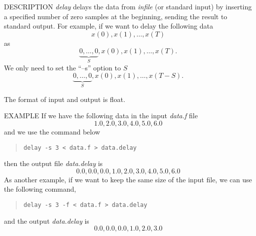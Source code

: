 \begin{synopsis}
\item [delay] [ --s $S$ ] [ --f ] [ {\em infile} ] 
\end{synopsis}

\begin{qsection}{DESCRIPTION}
{\em delay} delays the data from {\em infile} (or standard input) 
by inserting a specified number of zero samples at the beginning, 
sending the result to standard output.
 For example, if we want to delay the following data
\begin{displaymath}
   x(0), x(1), \ldots , x(T)
\end{displaymath}
as
\begin{displaymath}
   \underbrace{0, \dots , 0}_{S}, x(0), x(1), \dots , x(T).
\end{displaymath}
We only need to set the ``--s'' option to $S$
\begin{displaymath}
   \underbrace{0, \dots , 0}_{S}, x(0), x(1), \dots , x(T-S).
\end{displaymath}
\par
The format of input and output is float.
\end{qsection}

\begin{options}
\end{options}

\begin{qsection}{EXAMPLE}
If we have the following data in the input {\em data.f} file
\begin{displaymath}
 1.0, 2.0, 3.0, 4.0, 5.0, 6.0
\end{displaymath}
and we use the command below
\begin{quote}
 \verb!delay -s 3 < data.f > data.delay!
\end{quote}
then the output file {\em data.delay} is 
\begin{displaymath}
 0.0, 0.0, 0.0, 1.0, 2.0, 3.0, 4.0, 5.0, 6.0
\end{displaymath}
As another example, if we want to keep the same size of the input file,
we can use the following command,
\begin{quote}
\verb!delay -s 3 -f < data.f > data.delay!
\end{quote}
and the output {\em data.delay} is
\begin{displaymath}
 0.0, 0.0, 0.0, 1.0, 2.0, 3.0
\end{displaymath}
\end{qsection}

